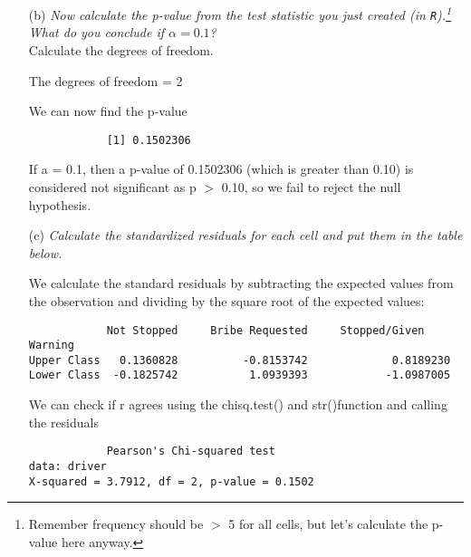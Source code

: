 \documentclass[12pt,letterpaper]{article}
\begin{document}
\begin{enumerate}
		\item [(b)]
		\emph{Now calculate the p-value from the test statistic you just created (in \texttt{R}).\footnote{Remember frequency should be $>$ 5 for all cells, but let's calculate the p-value here anyway.}  What do you conclude if $\alpha = 0.1$?}\\
		
		\noindent Calculate the degrees of freedom.
		
		\noindent The degrees of freedom = 2
		
		\noindent We can now find the p-value
		
		
		\begin{verbatim}
			[1] 0.1502306
		\end{verbatim}
		
		\noindent If a = 0.1, then a p-value of 0.1502306 (which is greater than 0.10) is considered not significant as p $>$ 0.10, so we fail to reject the null hypothesis.
		
		\item [(c)] \emph{Calculate the standardized residuals for each cell and put them in the table below.}
		\vspace{.5cm}
		
		\noindent We calculate the standard residuals by subtracting the expected values from the observation and dividing by the square root of the expected values:
		
		
	\begin{Verbatim} 
            Not Stopped 	Bribe Requested 	Stopped/Given Warning
Upper Class   0.1360828     	 -0.8153742             0.8189230
Lower Class  -0.1825742     	  1.0939393            -1.0987005
\end{Verbatim}
		
		\noindent We can check if r agrees using the chisq.test() and str()function and calling the residuals
		
		
		
		\begin{Verbatim} 
			Pearson's Chi-squared test
data: driver
X-squared = 3.7912, df = 2, p-value = 0.1502
			\end{Verbatim}
		
		
		

\end{enumerate}
\end{document}
